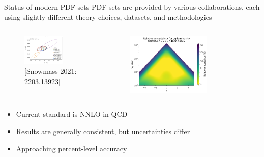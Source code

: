 \documentclass[aspectratio=169, 8pt,t]{beamer}
\begin{document}
\begin{frame}{Status of modern PDF sets}
  PDF sets are provided by various collaborations, each using slightly different theory choices, datasets, and methodologies
  \begin{columns}
    \begin{column}{0.49\textwidth}
      \begin{figure}
        \includegraphics[width=0.7\textwidth]{figures/Httbar_xsec.png}
        \caption*{\color{gray}\small \footnotesize [Snowmass 2021: 2203.13923]}
      \end{figure}
    \end{column}
    \begin{column}{0.49\textwidth}
      \begin{figure}
        \includegraphics[width=0.7\textwidth]{figures/gglumi.pdf}
      \end{figure}
    \end{column}
  \end{columns}
  \begin{itemize}
    \item Current standard is NNLO in QCD
    \item Results are generally consistent, but uncertainties differ
    \item Approaching percent-level accuracy
  \end{itemize}
\end{frame}
\end{document}
